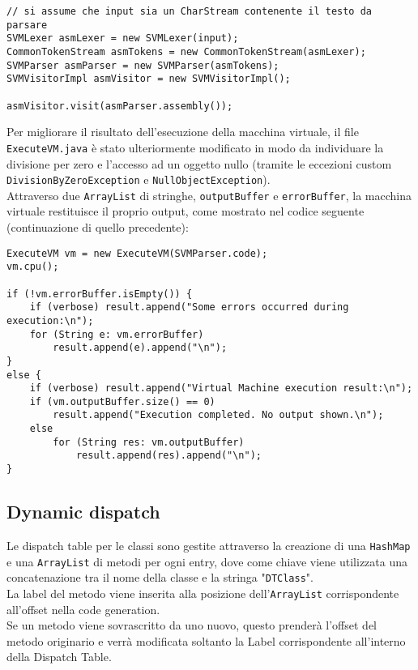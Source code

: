 \documentclass[a4paper]{article}   %
\begin{document}
\begin{lstlisting}[basicstyle=\footnotesize\ttfamily]
// si assume che input sia un CharStream contenente il testo da parsare
SVMLexer asmLexer = new SVMLexer(input);
CommonTokenStream asmTokens = new CommonTokenStream(asmLexer);
SVMParser asmParser = new SVMParser(asmTokens);
SVMVisitorImpl asmVisitor = new SVMVisitorImpl();

asmVisitor.visit(asmParser.assembly());
\end{lstlisting}
Per migliorare il risultato dell'esecuzione della macchina virtuale, il file \lstinline|ExecuteVM.java| è stato ulteriormente modificato in modo da individuare la divisione per zero e l'accesso ad un oggetto nullo (tramite le eccezioni custom \lstinline|DivisionByZeroException| e \lstinline|NullObjectException|).\\
Attraverso due \lstinline|ArrayList| di stringhe, \lstinline|outputBuffer| e \lstinline|errorBuffer|, la macchina virtuale restituisce il proprio output, come mostrato nel codice seguente (continuazione di quello precedente):
\begin{lstlisting}[basicstyle=\footnotesize\ttfamily]
ExecuteVM vm = new ExecuteVM(SVMParser.code);
vm.cpu();

if (!vm.errorBuffer.isEmpty()) {
	if (verbose) result.append("Some errors occurred during execution:\n");
	for (String e: vm.errorBuffer)
		result.append(e).append("\n");
}
else {
	if (verbose) result.append("Virtual Machine execution result:\n");
	if (vm.outputBuffer.size() == 0)
		result.append("Execution completed. No output shown.\n");
	else
		for (String res: vm.outputBuffer)
			result.append(res).append("\n");
}
\end{lstlisting}
\subsection{Dynamic dispatch}
Le dispatch table per le classi sono gestite attraverso la creazione di una \lstinline|HashMap| e una \lstinline|ArrayList| di metodi per ogni entry, dove come chiave viene utilizzata una concatenazione tra il nome della classe e la stringa "\lstinline|DTClass|".
\\
La label del metodo viene inserita alla posizione dell'\lstinline|ArrayList| corrispondente all'offset nella code generation.
\\
Se un metodo viene sovrascritto da uno nuovo, questo prenderà l'offset del metodo originario e verrà modificata soltanto la Label corrispondente all'interno della Dispatch Table.
\end{document}
